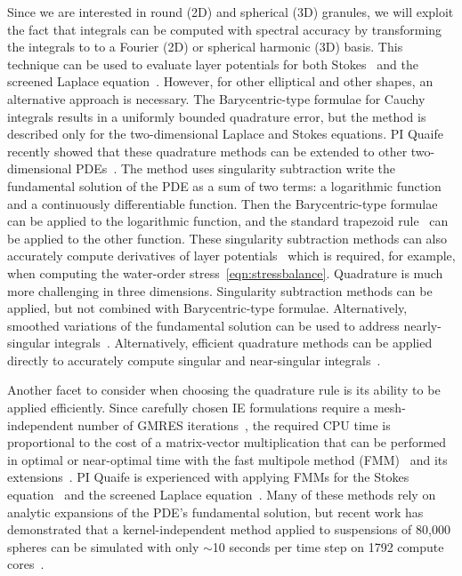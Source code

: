 Since we are interested in round (2D) and spherical (3D) granules, we
will exploit the fact that integrals can be computed with spectral
accuracy by transforming the integrals to to a Fourier (2D) or spherical
harmonic (3D) basis. This technique can be used to evaluate layer
potentials for both Stokes~\cite{cor-vee2018} and the screened Laplace
equation~\cite{koh-cor-che-vee2021}. However, for other elliptical and
other shapes, an alternative approach is necessary. The Barycentric-type
formulae for Cauchy integrals results in a uniformly bounded quadrature
error, but the method is described only for the two-dimensional Laplace
and Stokes equations. PI Quaife recently showed that these quadrature
methods can be extended to other two-dimensional
PDEs~\cite{che-lin-her-qua2022}. The method uses singularity subtraction
write the fundamental solution of the PDE as a sum of two terms: a
logarithmic function and a continuously differentiable function. Then
the Barycentric-type formulae can be applied to the logarithmic
function, and the standard trapezoid rule~\cite{tre-wei2014} can be
applied to the other function. These singularity subtraction methods can
also accurately compute derivatives of layer potentials~\cite{car2021,
car2020, car-kha-kim2018} which is required, for example, when computing
the water-order stress~\eqref{eqn:stressbalance}. Quadrature is much
more challenging in three dimensions. Singularity subtraction methods
can be applied, but not combined with Barycentric-type formulae.
Alternatively, smoothed variations of the fundamental solution can be
used to address nearly-singular integrals~\cite{beale1, cor2001,
tlu-bea2019}.  Alternatively, efficient quadrature methods can be
applied directly to accurately compute singular and near-singular
integrals~\cite{khayat_2005, gimbutas2013sisc}.

Another facet to consider when choosing the quadrature rule is its
ability to be applied efficiently. Since carefully chosen IE
formulations require a mesh-independent number of GMRES
iterations~\cite{cam-ips-kel-mey-xue1996}, the required CPU time is
proportional to the cost of a matrix-vector multiplication that can be
performed in optimal or near-optimal time with the fast multipole method
(FMM)~\cite{fmm5} and its extensions~\cite{fmm1, fmm2, fmm3, fmm4, fmm6,
fmm7, ros-ols2016}. PI Quaife is experienced with applying FMMs for the
Stokes equation~\cite{qua-bir2014, bys-sha-qua2020} and the screened
Laplace equation~\cite{kro-qua2011, qua2011}. Many of these methods rely
on analytic expansions of the PDE's fundamental solution, but recent
work has demonstrated that a kernel-independent method applied to
suspensions of 80,000 spheres can be simulated with only $\sim$10
seconds per time step on 1792 compute cores~\cite{Yan2019}.

